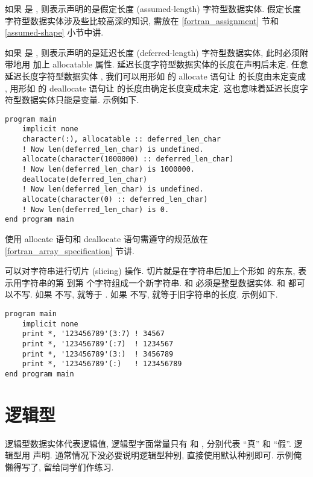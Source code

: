 如果 \ttt{[len]} 是 \ttt{*}, 则表示声明的是假定长度 (assumed-length) 字符型数据实体. 假定长度字符型数据实体涉及些比较高深的知识, 需放在 \ref{fortran_assignment} 节和 \ref{assumed-shape} 小节中讲.

如果 \ttt{[len]} 是 \ttt{:}, 则表示声明的是延迟长度 (deferred-length) 字符型数据实体, 此时必须附带地用  加上 allocatable 属性. 延迟长度字符型数据实体的长度在声明后未定. 任意延迟长度字符型数据实体 \ttt{[c\_{}ds]}, 我们可以用形如  的 allocate 语句让 \ttt{[c\_{}ds]} 的长度由未定变成 \ttt{[len]}, 用形如  的 deallocate 语句让 \ttt{[c\_{}ds]} 的长度由确定长度变成未定. 这也意味着延迟长度字符型数据实体只能是变量. 示例如下.
\begin{lstlisting}
program main
    implicit none
    character(:), allocatable :: deferred_len_char
    ! Now len(deferred_len_char) is undefined.
    allocate(character(1000000) :: deferred_len_char)
    ! Now len(deferred_len_char) is 1000000.
    deallocate(deferred_len_char)
    ! Now len(deferred_len_char) is undefined.
    allocate(character(0) :: deferred_len_char)
    ! Now len(deferred_len_char) is 0.
end program main
\end{lstlisting}
使用 allocate 语句和 deallocate 语句需遵守的规范放在 \ref{fortran_array_specification} 节讲.

可以对字符串进行切片 (slicing) 操作. 切片就是在字符串后加上个形如  的东东, 表示用字符串的第  到第  个字符组成一个新字符串.  和  必须是整型数据实体.  和  都可以不写. 如果  不写,  就等于 . 如果  不写,  就等于旧字符串的长度. 示例如下.
\begin{lstlisting}
program main
    implicit none
    print *, '123456789'(3:7) ! 34567
    print *, '123456789'(:7)  ! 1234567
    print *, '123456789'(3:)  ! 3456789
    print *, '123456789'(:)   ! 123456789
end program main
\end{lstlisting}

\section{逻辑型}

逻辑型数据实体代表逻辑值, 逻辑型字面常量只有  和 , 分别代表 ``真'' 和 ``假''. 逻辑型用  声明. 通常情况下没必要说明逻辑型种别, 直接使用默认种别即可. 示例俺懒得写了, 留给同学们作练习.
